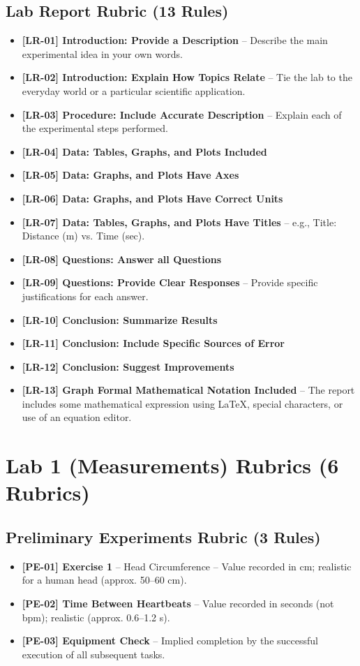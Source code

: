 \documentclass{article}
\begin{document}
\subsection*{Lab Report Rubric (13 Rules)}
\begin{itemize}
\item \textbf{ [LR-01] Introduction: Provide a Description } –  Describe the main experimental idea in your own words.
\item \textbf{ [LR-02] Introduction:  Explain How Topics Relate } – Tie the lab to the everyday world or a particular scientific application.
\item \textbf{ [LR-03] Procedure: Include Accurate Description } – Explain each of the experimental steps performed.
\item \textbf{ [LR-04] Data: Tables, Graphs, and Plots Included }
\item \textbf{ [LR-05] Data:  Graphs, and Plots Have Axes }
\item \textbf{ [LR-06] Data: Graphs, and Plots Have Correct Units }
\item \textbf{ [LR-07] Data: Tables, Graphs, and Plots Have Titles } – e.g., Title: Distance (m) vs. Time (sec).
\item \textbf{ [LR-08] Questions:  Answer all Questions } 
\item \textbf{ [LR-09] Questions:  Provide Clear Responses } – Provide specific justifications for each answer.
\item \textbf{ [LR-10] Conclusion:  Summarize Results }
\item \textbf{ [LR-11] Conclusion:  Include Specific Sources of Error }
\item \textbf{ [LR-12] Conclusion:  Suggest Improvements }
\item \textbf{ [LR-13] Graph Formal Mathematical Notation Included } –  The report includes some mathematical expression using LaTeX, special characters, or use of an equation editor. 
\end{itemize}

\section*{Lab 1 (Measurements) Rubrics (6 Rubrics)}

\subsection*{Preliminary Experiments Rubric (3 Rules)}
\begin{itemize}
\item \textbf{ [PE-01] Exercise 1 } –  Head Circumference –  Value recorded in cm; realistic for a human head (approx. 50–60 cm).
\item \textbf{ [PE-02] Time Between Heartbeats } –  Value recorded in seconds (not bpm); realistic (approx. 0.6–1.2 s).
\item \textbf{ [PE-03] Equipment Check } –  Implied completion by the successful execution of all subsequent tasks.
\end{itemize}
\end{document}

